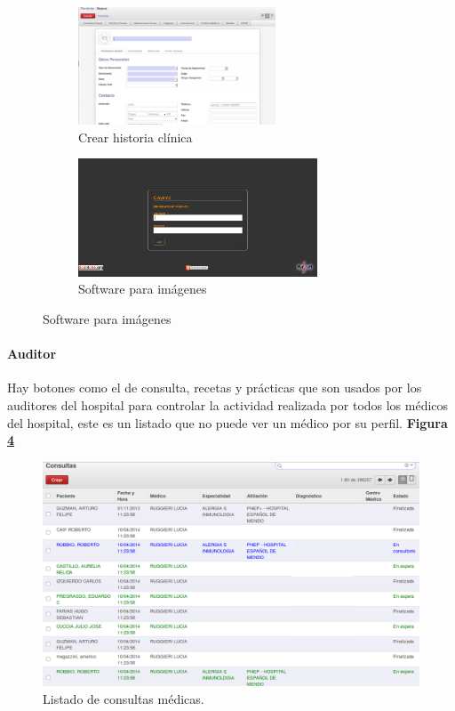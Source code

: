\begin{figure}[h]
      \centering
      \begin{subfigure}[t]{0.48\textwidth}
        \includegraphics[height=3.5cm]{img/tp1/HE/HCUD2}
        \caption{Crear historia clínica}
        \label{hc-nueva}
      \end{subfigure}
      \hfill%
      \begin{subfigure}[t]{0.548\textwidth}
        \includegraphics[height=3.5cm]{img/tp1/HE/Imagenes}
        \caption{Software para imágenes}
        \label{sw-imagen}
	  \end{subfigure}
\end{figure}


\paragraph{Auditor}

Hay botones como el de consulta, recetas y prácticas que son usados por los auditores del hospital para controlar la actividad realizada por todos los médicos del hospital, este es un listado que no puede ver un médico por su perfil. \textbf{Figura \ref{consultas-auditor}}


\begin{figure}[h]
      \centering
      \includegraphics[width=.8\textwidth]{img/tp1/HE/HCUDConsulta}
      \caption{Listado de consultas médicas.}
      \label{consultas-auditor}
\end{figure}


